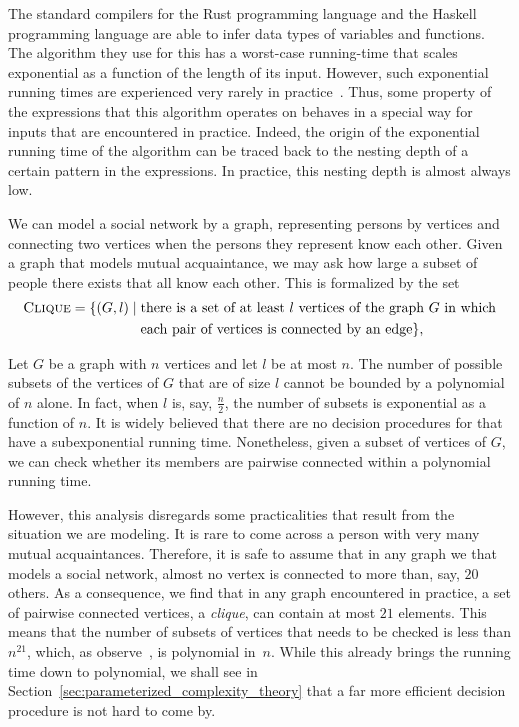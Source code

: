 \begin{example}
\label{ex:type_inference}%
  The standard compilers for the Rust programming language and the Haskell programming language are able to infer data types of variables and functions.
  The algorithm they use for this has a worst-case running-time that scales exponential as a function of the length of its input.
  However, such exponential running times are experienced very rarely in practice~\parencite{kanellakis1989polymorphic}.
  Thus, some property of the expressions that this algorithm operates on behaves in a special way for inputs that are encountered in practice.
  Indeed, the origin of the exponential running time of the algorithm can be traced back to the nesting depth of a certain pattern in the expressions.
  In practice, this nesting depth is almost always low.
\end{example}

\begin{example}
\label{ex:clique}%
  We can model a social network by a graph, representing persons by vertices and connecting two vertices when the persons they represent know each other.
  Given a graph that models mutual acquaintance, we may ask how large a subset of people there exists that all know each other.
  This is formalized by the set
  \begin{align*}
    \defkeyat{Clique@\pr{Clique}}{\pr{Clique}} \deq \{(G, l) \st &\text{there is a set of at least $l$ vertices of the graph~$G$ in which} \\
    	&\text{each pair of vertices is connected by an edge}\},
  \end{align*}

  Let $G$ be a graph with $n$ vertices and let $l$ be at most $n$.
  The number of possible subsets of the vertices of $G$ that are of size $l$ cannot be bounded by a polynomial of $n$ alone.
  In fact, when $l$ is, say, $\frac{n}{2}$, the number of subsets is exponential as a function of $n$.
  It is widely believed that there are no decision procedures for  that have a subexponential running time.
  Nonetheless, given a subset of vertices of $G$, we can check whether its members are pairwise connected within a polynomial running time.

  However, this analysis disregards some practicalities that result from the situation we are modeling.
  It is rare to come across a person with very many mutual acquaintances.
  Therefore, it is safe to assume that in any graph we that models a social network, almost no vertex is connected to more than, say, $20$ others.
  As a consequence, we find that in any graph encountered in practice, a set of pairwise connected vertices, a \emph{clique}, can contain at most $21$ elements.
  This means that the number of subsets of vertices that needs to be checked is less than $n^{21}$, which, as \citeauthor{garey1979computers} observe~\parencite[Section~4.1]{garey1979computers}, is polynomial in~$n$.
  While this already brings the running time down to polynomial, we shall see in Section~\ref{sec:parameterized_complexity_theory} that a far more efficient decision procedure is not hard to come by.
\end{example}

